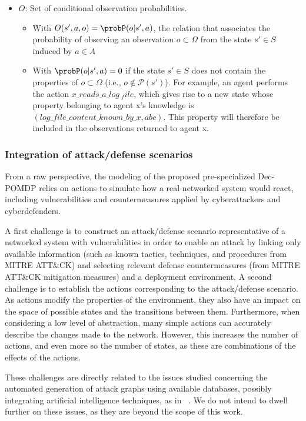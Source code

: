 \begin{itemize}
  \item $O$: Set of conditional observation probabilities.
        \begin{itemize}
          \item With $O(s',a,o) = \probP(o|s',a)$, the relation that associates the probability of observing an observation $o \subset \Omega$ from the state $s' \in S$ induced by $a \in A$
          \item With $\probP (o|s',a) = 0$ if the state $s' \in S$ does not contain the properties of $o \subset \Omega$ (i.e., $o \not\in \mathcal{P}(s')$). For example, an agent performs the action $x\_reads\_a\_log\ _file$, which gives rise to a new state whose property belonging to agent x's knowledge is $(log\_file\_content\_known\_by\_x, \allowbreak abc)$. This property will therefore be included in the observations returned to agent x.
        \end{itemize}

\end{itemize}


\subsubsection {Integration of attack/defense scenarios}

\noindent
From a raw perspective, the modeling of the proposed pre-specialized Dec-POMDP relies on actions to simulate how a real networked system would react, including vulnerabilities and countermeasures applied by cyberattackers and cyberdefenders.

A first challenge is to construct an attack/defense scenario representative of a networked system with vulnerabilities in order to enable an attack by linking only available information (such as known tactics, techniques, and procedures from MITRE ATT&CK) and selecting relevant defense countermeasures (from MITRE ATT&CK mitigation measures) and a deployment environment. A second challenge is to establish the actions corresponding to the attack/defense scenario. As actions modify the properties of the environment, they also have an impact on the space of possible states and the transitions between them.
Furthermore, when considering a low level of abstraction, many simple actions can accurately describe the changes made to the network. However, this increases the number of actions, and even more so the number of states, as these are combinations of the effects of the actions.

These challenges are directly related to the issues studied concerning the automated generation of attack graphs using available databases, possibly integrating artificial intelligence techniques, as in ~\cite{GFalco2018}. We do not intend to dwell further on these issues, as they are beyond the scope of this work.

